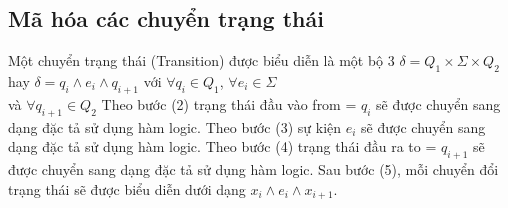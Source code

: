 \documentclass{article}
\begin{document}
\begin{flushleft}
		\subsection{Mã hóa các chuyển trạng thái}
		Một chuyển trạng thái (Transition) được biểu diễn là một bộ 3 $\delta = Q_{1} \times \Sigma \times Q_{2}$ hay $\delta = q_{i} \land e_i \land q_{i+1}$ với $\forall q_{i} \in Q_{1}$, $\forall e_{i} \in \Sigma$\\ và $\forall q_{i+1} \in Q_{2}$
		Theo bước (2) trạng thái đầu vào from = $q_{i}$ sẽ được chuyển sang dạng đặc tả sử dụng hàm logic. Theo bước (3) sự kiện $e_i$ sẽ được chuyển sang dạng đặc tả sử dụng hàm logic. Theo bước (4) trạng thái đầu ra to = $q_{i+1}$ sẽ được chuyển sang dạng đặc tả sử dụng hàm logic. Sau bước (5), mỗi chuyển đổi trạng thái sẽ được biểu diễn dưới dạng $x_{i} \land e_i \land x_{i+1}$.\\

\end{flushleft}
\end{document}
